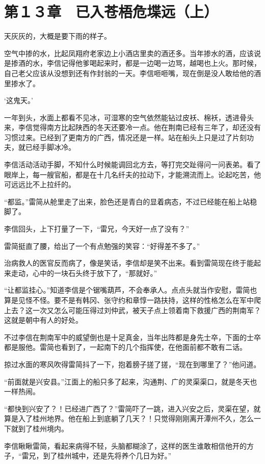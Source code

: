 \section{第１３章　已入苍梧危堞远（上）}

天灰灰的，大概是要下雨的样子。

空气中掺的水，比起凤翔府老家边上小酒店里卖的酒还多。当年掺水的酒，应该说是掺酒的水，李信记得他爹喝起来时，都是一边喝一边骂，越喝也上火。那时候，自己老父应该从没想到还有作封翁的一天。李信咂咂嘴，现在倒是没人敢给他的酒里掺水了。

‘这鬼天。’

一年到头，水面上都看不见冰，可湿寒的空气依然能钻过皮袄、棉袄，透进骨头来，李信觉得南方比起陕西的冬天还要冷一点。他在荆南已经有三年了，却还没有习惯过来。已经到了更南方的广西，情况还是一样。站在船头上只是过了片刻功夫，就已经手脚冰冷。

李信活动活动手脚，不知什么时候能调回北方去，等打完交趾得问一问表弟。看了眼岸上，每一艘官船，都是在十几名纤夫的拉动下，才能溯流而上。论起吃苦，他可远远比不上拉纤的。

“都监。”雷简从舱里走了出来，脸色还是青白的显着病态，不过已经能在船上站稳脚了。

李信回头，上下打量了一下，“雷兄，今天好一点了没有？”

雷简挺直了腰，给出了一个有点勉强的笑容：“好得差不多了。”

治病救人的医官反而病了，像是笑话，李信却是笑不出来。看到雷简现在终于能起来走动，心中的一块石头终于放下了，“那就好。”

“让都监挂心。”知道李信是个锯嘴葫芦，不会奉承人。点点头就当作安慰，雷简也算是见怪不怪。要不是有韩冈、张守约和章惇一路扶持，这样的性格怎么在军中爬上去？这一次又怎么可能压得过刘仲武，被天子点上领着南下救援广西的荆南军？这就是朝中有人的好处。

不过李信在荆南军中的威望倒也是十足真金，当年出阵都是身先士卒，下面的士卒都是服他。雷简也看到了，一起南下的几个指挥使，在他面前都不敢有二话。

掠过水面的寒风吹得雷简抖了一下，抱着膀子搓了搓，“现在到哪里了？”他问道。

“前面就是兴安县。”江面上的船只多了起来，沟通荆、广的灵渠渠口，就是冬天也一样热闹。

“都快到兴安了？！已经进广西了？”雷简吓了一跳，进入兴安之后，灵渠在望，就算是入了桂州地界。他在船上到底躺了几天？！只觉得刚刚离开潭州不久，怎么一下就到了桂州境内。

李信瞅瞅雷简，看起来病得不轻，头脑都糊涂了，这样的医生谁敢相信他开的方子，“雷兄，到了桂州城中，还是先将养个几日为好。”

